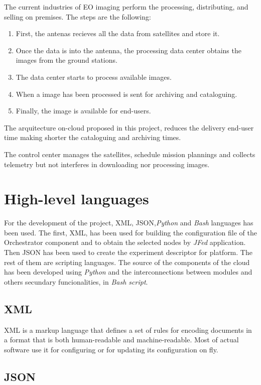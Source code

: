 The current industries of \ac{EO} imaging perform the processing, distributing, and
selling on premises. The steps are the following:
\begin{enumerate}
\item First, the antenas recieves all the data from satellites and store it.
\item Once the data is into the antenna, the processing data center obtains the
  images from the ground stations.
\item The data center starts to process available images.
\item When a image has been processed is sent for archiving and
  cataloguing. 
\item Finally, the image is available for end-users.
\end{enumerate}

The arquitecture on-cloud proposed in this project, reduces the delivery
end-user time making shorter the cataloguing and archiving times.

The control center manages the satellites, schedule mission plannings and
collects telemetry but not interferes in downloading nor processing images.


\section{High-level languages}

For the development of the project, \ac{XML}, \ac{JSON},\emph{Python} and \emph{Bash} languages has
been used. The first, \ac{XML}, has been used for building the configuration file of
the Orchestrator component and to obtain the selected nodes by \emph{JFed}
application. Then \ac{JSON} has been used to create the experiment descriptor for
\bonfire platform. The rest of them are scripting languages. The source of the
components of the cloud has been developed using \emph{Python} and the interconnections
between modules and others secundary funcionalities, in \emph{Bash script}.

\subsection{XML}
\ac{XML} is a markup language that defines a set of rules for encoding
documents in a format that is both human-readable and machine-readable. Most of
actual software use it for configuring or for updating its configuration on fly.

\subsection{JSON}

